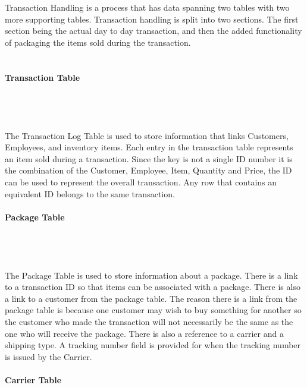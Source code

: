 \documentclass{report}
\begin{document}
        Transaction Handling is a process that has data spanning two tables with two more supporting
        tables. Transaction handling is split into two sections. The first section being the actual
        day to day transaction, and then the added functionality of packaging the items sold during
        the transaction.\\
        \\
        \\
        {\bf Transaction Table}\\
        \\
        \\
        \\
        \\
        The Transaction Log Table is used to store information that links Customers, Employees, and
        inventory items. Each entry in the transaction table represents an item sold during a transaction.
        Since the key is not a single ID number it is the combination of the Customer, Employee, Item,
        Quantity and Price, the ID can be used to represent the overall transaction. Any row that contains
        an equivalent ID belongs to the same transaction.
        \\
        \\
        {\bf Package Table}\\
        \\
        \\
        \\
        \\
        The Package Table is used to store information about a package. There is a link to a transaction ID
        so that items can be associated with a package. There is also a link to a customer from the package
        table. The reason there is a link from the package table is because one customer may wish to buy
        something for another so the customer who made the transaction will not necessarily be the same as
        the one who will receive the package. There is also a reference to a carrier and a shipping type.
        A tracking number field is provided for when the tracking number is issued by the Carrier.
        \\
        \\
        {\bf Carrier Table}\\
        \\
\end{document}

